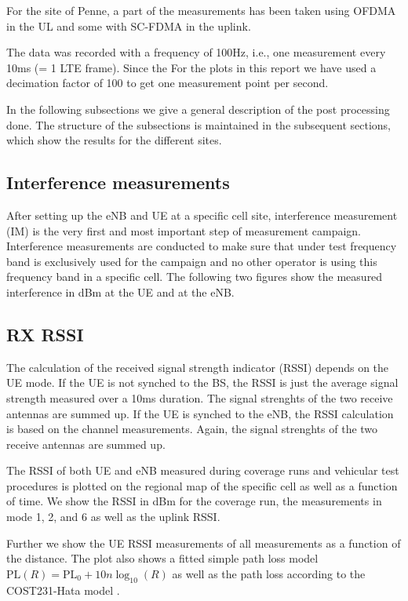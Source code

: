 \documentclass[a4paper,10pt]{article}
\begin{document}
For the site of Penne, a part of the measurements has been taken using OFDMA in the UL and some with SC-FDMA in the uplink.

The data was recorded with a frequency of 100Hz, i.e., one measurement every 10ms (= 1 LTE frame). Since the For the plots in this report we have used a decimation factor of 100 to get one measurement point per second. 

In the following subsections we give a general description of the post processing done. The structure of the subsections is maintained in the subsequent sections, which show the results for the different sites. 

\subsection{Interference measurements}

After setting up the eNB and UE at a specific cell site, interference measurement (IM) is the very first and most important step of measurement campaign. Interference measurements are conducted to make sure that under test frequency band is exclusively used for the campaign and no other operator is using this frequency band in a specific cell. The following two figures show the measured interference in dBm at the UE and at the eNB.

\subsection{RX RSSI}


The calculation of the received signal strength indicator (RSSI) depends on the UE mode. If the UE is not synched to the BS, the RSSI is just the average signal strength measured over a 10ms duration. The signal strenghts of the two receive antennas are summed up. If the UE is synched to the eNB, the RSSI calculation is based on the channel measurements. Again, the signal strenghts of the two receive antennas are summed up.

The RSSI of both UE and eNB measured during coverage runs and vehicular test procedures is plotted on the regional map of the specific cell as well as a function of time. We show the RSSI in dBm for the coverage run, the measurements in mode 1, 2, and 6 as well as the uplink RSSI. 

Further we show the UE RSSI measurements of all measurements as a function of the distance. The plot also shows a fitted simple path loss model $\mathrm{PL}(R) = \mathrm{PL}_0 + 10n\log_{10}(R)$ as well as the path loss according to the COST231-Hata model \cite{cost231}.
\end{document}

